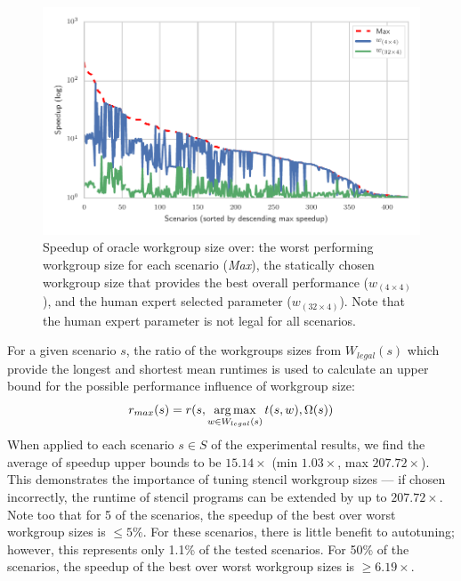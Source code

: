 \documentclass[nonatbib,preprint,9pt]{sigplanconf}
\begin{document}
\begin{figure}
  \includegraphics[width=\columnwidth]{img/max_speedups}
  \caption[Workgroup size speedups]{%
    Speedup of oracle workgroup size over: the worst performing
    workgroup size for each scenario (\emph{Max}), the statically
    chosen workgroup size that provides the best overall performance
    ($w_{(4 \times 4)}$), and the human expert selected parameter
    ($w_{(32 \times 4)}$). Note that the human expert parameter is not
    legal for all scenarios.%
  }
\label{fig:speedups}
\end{figure}

For a given scenario $s$, the ratio of the workgroups sizes from
$W_{legal}(s)$ which provide the longest and shortest mean runtimes is
used to calculate an upper bound for the possible performance
influence of workgroup size:
%
\begin{equation}
r_{max}(s) = r(s, \operatorname*{arg\,max}_{w \in W_{legal}(s)} t(s,w), \Omega(s))
\end{equation}
%
When applied to each scenario $s \in S$ of the experimental results,
we find the average of speedup upper bounds to be $15.14\times$ (min
$1.03\times$, max $207.72\times$). This demonstrates the importance of
tuning stencil workgroup sizes --- if chosen incorrectly, the runtime
of stencil programs can be extended by up to $207.72\times$. Note too
that for 5 of the scenarios, the speedup of the best over worst
workgroup sizes is $\le 5\%$.
For these scenarios, there is little benefit to autotuning; however,
this represents only 1.1\% of the tested scenarios. For 50\% of the
scenarios, the speedup of the best over worst workgroup sizes is
$\ge 6.19\times$.


\end{document}
